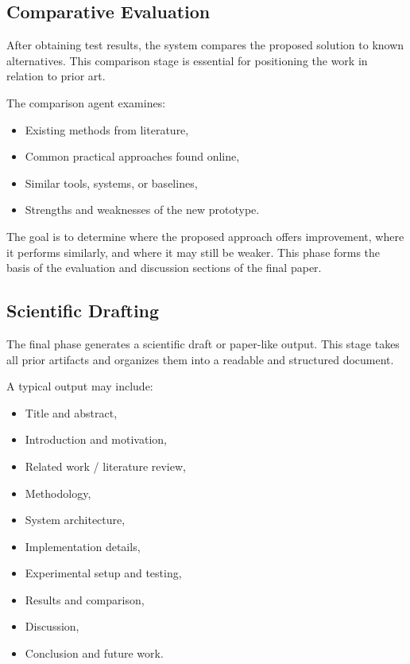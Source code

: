 \documentclass[11pt,a4paper]{article}
\begin{document}
\subsection{Comparative Evaluation}

After obtaining test results, the system compares the proposed solution to known alternatives. This comparison stage is essential for positioning the work in relation to prior art.

The comparison agent examines:
\begin{itemize}
    \item Existing methods from literature,
    \item Common practical approaches found online,
    \item Similar tools, systems, or baselines,
    \item Strengths and weaknesses of the new prototype.
\end{itemize}

The goal is to determine where the proposed approach offers improvement, where it performs similarly, and where it may still be weaker. This phase forms the basis of the evaluation and discussion sections of the final paper.

\subsection{Scientific Drafting}

The final phase generates a scientific draft or paper-like output. This stage takes all prior artifacts and organizes them into a readable and structured document.

A typical output may include:
\begin{itemize}
    \item Title and abstract,
    \item Introduction and motivation,
    \item Related work / literature review,
    \item Methodology,
    \item System architecture,
    \item Implementation details,
    \item Experimental setup and testing,
    \item Results and comparison,
    \item Discussion,
    \item Conclusion and future work.
\end{itemize}
\end{document}
